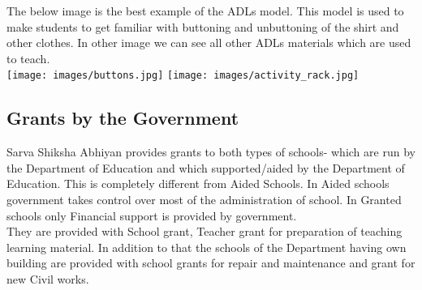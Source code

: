 The below image is the best example of the ADLs model. This model is used to make students to get familiar with buttoning and unbuttoning of the shirt and other clothes. In other image we can see all other ADLs materials which are used to teach. \\[1\baselineskip]
    \texttt{[image: images/buttons.jpg]} \hfill
    \texttt{[image: images/activity\_rack.jpg]}

\subsection{Grants by the Government}
Sarva Shiksha Abhiyan provides grants to both types of schools- which are run by the Department of Education and which supported/aided by the Department of Education. This is completely different from Aided Schools. In Aided schools government takes control over most of the administration of school. In Granted schools only Financial support is provided by government. \\

They are provided with School grant, Teacher grant for preparation of teaching learning material. In addition to that the schools of the Department having own building are provided with school grants for repair and maintenance and grant for new Civil works.\\

